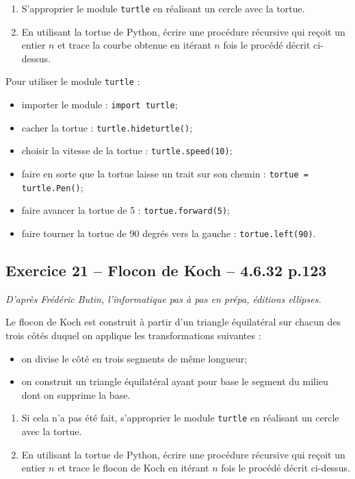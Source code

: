 \documentclass[10pt,fleqn]{article} %
\begin{document}
\begin{multicols}{2}
\begin{enumerate}
\item S'approprier le module \texttt{turtle} en réalisant un cercle avec la tortue.
\item En utilisant la tortue de Python, écrire une procédure récursive qui reçoit un entier $n$ et trace la courbe obtenue en itérant $n$ fois le procédé décrit ci-dessus.
\end{enumerate}
\begin{rem}
Pour utiliser le module \texttt{turtle} :
\begin{itemize}
\item importer le module : \texttt{import turtle};
\item cacher la tortue : \texttt{turtle.hideturtle()};
\item choisir la vitesse de la tortue : \texttt{turtle.speed(10)};
\item faire en sorte que la tortue laisse un trait sur son chemin : \texttt{tortue = turtle.Pen()};
\item faire avancer la tortue de 5 : \texttt{tortue.forward(5)};
\item faire tourner la tortue de 90 degrés vers la gauche : \texttt{tortue.left(90)}.
\end{itemize}
\end{rem}

\subsection*{Exercice 21 -- Flocon de Koch -- 4.6.32 p.123}
\begin{flushright}
\textit{D'après Frédéric Butin, l'informatique pas à pas en prépa, éditions ellipses.}
\end{flushright}
Le flocon de Koch est construit à partir d'un triangle équilatéral sur chacun des trois côtés duquel on applique les transformations suivantes : 
\begin{itemize}
\item on divise le côté en trois segments de même longueur;
\item on construit un triangle équilatéral ayant pour base le segment du milieu dont on supprime la base.
\end{itemize}
\begin{enumerate}
\item Si cela n'a pas été fait, s'approprier le module \texttt{turtle} en réalisant un cercle avec la tortue.
\item En utilisant la tortue de Python, écrire une procédure récursive qui reçoit un entier $n$ et trace le flocon de Koch en itérant $n$ fois le procédé décrit ci-dessus.
\end{enumerate}


\end{multicols}
\end{document}
